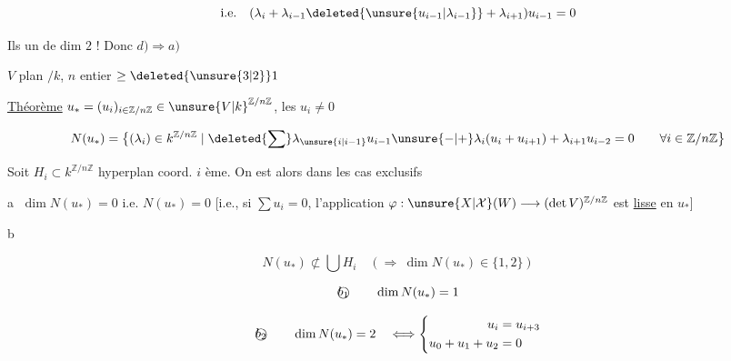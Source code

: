 \[
\text{i.e.}\quad
(\lambda_i+\lambda_{i-1}\deleted{\unsure{u_{i-1}|\lambda_{i-1}}}+\lambda_{i+1})u_{i-1}=0
\]

Ils  un  de dim $2$ ! Donc $d)\Rightarrow a)$



$V$ plan  $/k$, $n$ entier $\geq\deleted{\unsure{3|2}}1$

\uline{Théorème} $u_*=(u_i)_{i\in\mathbb Z/n\mathbb Z}\in{\unsure{V|k}}^{\mathbb Z/n\mathbb Z}$, les $u_i\ne0$

\[
 N(u_*)=\bigl\{(\lambda_i)\in k^{\mathbb Z/n\mathbb Z}\mid
 \deleted{\sum}\lambda_{\unsure{i|i-1}}u_{i-1}\unsure{-|+}\lambda_i(u_i+u_{i+1})+
 \lambda_{i+1}u_{i-2}=0\qquad\forall i\in\mathbb Z/n\mathbb Z\bigr\}
\]

Soit $H_i\subset k^{\mathbb Z/n\mathbb Z}$ hyperplan coord. $i$ ème. On est alors dans les cas  exclusifs


\textcircled{a} $\dim N(u_*)=0$ i.e. $N(u_*)=0$ [i.e., si $\sum u_i=0$, l'application  $\varphi:\unsure{X|\mathcal X}(W)\longrightarrow(\det V)^{\mathbb Z/n\mathbb Z}$ est \uline{lisse} en $u_*$]

\textcircled{b} 

\[
 N(u_*)\not\subset\bigcup H_i\quad(\Longrightarrow\ \dim N(u_*)\in\{1,2\})
\]


\[
 \text{\textcircled{$b_1$}}\qquad \dim N(u_*)=1
\]


\[
 \text{\textcircled{$b_2$}}\qquad \dim N(u_*)=2\quad\Longleftrightarrow
 \left\{\begin{aligned}u_i&=u_{i+3}\\u_0+u_1+u_2&=0\end{aligned}\right.
\]

